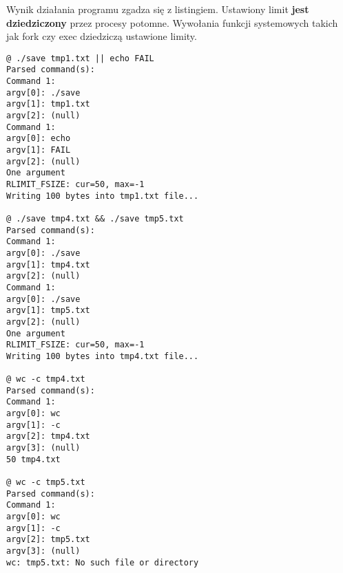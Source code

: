 \documentclass[a4paper,15pt]{article}
\begin{document}
Wynik działania programu zgadza się z listingiem. Ustawiony limit \textbf{jest dziedziczony} przez procesy potomne. Wywołania funkcji systemowych takich jak fork czy exec dziedziczą ustawione limity. 
\begin{lstlisting}[style=CStyle, label=some-code, caption=plik shell.c - przed główną pętlą]
@ ./save tmp1.txt || echo FAIL
Parsed command(s):
Command 1:
argv[0]: ./save
argv[1]: tmp1.txt
argv[2]: (null)
Command 1:
argv[0]: echo
argv[1]: FAIL
argv[2]: (null)
One argument
RLIMIT_FSIZE: cur=50, max=-1
Writing 100 bytes into tmp1.txt file...

@ ./save tmp4.txt && ./save tmp5.txt
Parsed command(s):
Command 1:
argv[0]: ./save
argv[1]: tmp4.txt
argv[2]: (null)
Command 1:
argv[0]: ./save
argv[1]: tmp5.txt
argv[2]: (null)
One argument
RLIMIT_FSIZE: cur=50, max=-1
Writing 100 bytes into tmp4.txt file...

@ wc -c tmp4.txt
Parsed command(s):
Command 1:
argv[0]: wc
argv[1]: -c
argv[2]: tmp4.txt
argv[3]: (null)
50 tmp4.txt

@ wc -c tmp5.txt
Parsed command(s):
Command 1:
argv[0]: wc
argv[1]: -c
argv[2]: tmp5.txt
argv[3]: (null)
wc: tmp5.txt: No such file or directory
\end{lstlisting}
\end{document}
